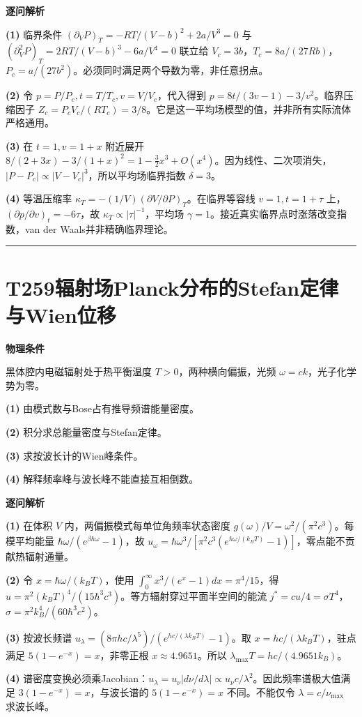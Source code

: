\documentclass[UTF8,a4paper,11pt,oneside,openany]{ctexbook}
\begin{document}
\par\medskip\noindent\textbf{逐问解析}
\par\noindent\textbf{(1)} 临界条件 \((\partial_VP)_T=-RT/(V-b)^2+2a/V^3=0\) 与 \((\partial_V^2P)_T=2RT/(V-b)^3-6a/V^4=0\) 联立给 \(V_c=3b\)，\(T_c=8a/(27Rb)\)，\(P_c=a/(27b^2)\)。必须同时满足两个导数为零，非任意拐点。
\par\noindent\textbf{(2)} 令 \(p=P/P_c,t=T/T_c,v=V/V_c\)，代入得到 \(p=8t/(3v-1)-3/v^2\)。临界压缩因子 \(Z_c=P_cV_c/(RT_c)=3/8\)。它是这一平均场模型的值，并非所有实际流体严格通用。
\par\noindent\textbf{(3)} 在 \(t=1,v=1+x\) 附近展开 \(8/(2+3x)-3/(1+x)^2=1-\tfrac32x^3+O(x^4)\)。因为线性、二次项消失，\(|P-P_c|\propto|V-V_c|^3\)，所以平均场临界指数 \(\delta=3\)。
\par\noindent\textbf{(4)} 等温压缩率 \(\kappa_T=-(1/V)(\partial V/\partial P)_T\)。在临界等容线 \(v=1,t=1+\tau\) 上，\((\partial p/\partial v)_t=-6\tau\)，故 \(\kappa_T\propto|\tau|^{-1}\)，平均场 \(\gamma=1\)。接近真实临界点时涨落改变指数，van der Waals并非精确临界理论。

\par\bigskip\hrule\bigskip
\section*{T259\quad 辐射场Planck分布的Stefan定律与Wien位移}
\textbf{物理条件}\par 黑体腔内电磁辐射处于热平衡温度 \(T>0\)，两种横向偏振，光频 \(\omega=ck\)，光子化学势为零。
\par\noindent\textbf{(1)} 由模式数与Bose占有推导频谱能量密度。
\par\noindent\textbf{(2)} 积分求总能量密度与Stefan定律。
\par\noindent\textbf{(3)} 求按波长计的Wien峰条件。
\par\noindent\textbf{(4)} 解释频率峰与波长峰不能直接互相倒数。

\par\medskip\noindent\textbf{逐问解析}
\par\noindent\textbf{(1)} 在体积 \(V\) 内，两偏振模式每单位角频率状态密度 \(g(\omega)/V=\omega^2/(\pi^2c^3)\)。每模平均能量 \(\hbar\omega/(e^{\beta\hbar\omega}-1)\)，故 \(u_\omega=\hbar\omega^3/[\pi^2c^3(e^{\hbar\omega/(k_BT)}-1)]\)，零点能不贡献热辐射通量。
\par\noindent\textbf{(2)} 令 \(x=\hbar\omega/(k_BT)\)，使用 \(\int_0^\infty x^3/(e^x-1)dx=\pi^4/15\)，得 \(u=\pi^2(k_BT)^4/(15\hbar^3c^3)\)。等方辐射穿过平面半空间的能流 \(j^*=cu/4=\sigma T^4\)，\(\sigma=\pi^2k_B^4/(60\hbar^3c^2)\)。
\par\noindent\textbf{(3)} 按波长频谱 \(u_\lambda=(8\pi hc/\lambda^5)/(e^{hc/(\lambda k_BT)}-1)\)。取 \(x=hc/(\lambda k_BT)\)，驻点满足 \(5(1-e^{-x})=x\)，非零正根 \(x\approx4.9651\)。所以 \(\lambda_{\max}T=hc/(4.9651k_B)\)。
\par\noindent\textbf{(4)} 谱密度变换必须乘Jacobian：\(u_\lambda=u_\nu|d\nu/d\lambda|\propto u_\nu c/\lambda^2\)。因此频率谱极大值满足 \(3(1-e^{-x})=x\)，与波长谱的 \(5(1-e^{-x})=x\) 不同。不能仅令 \(\lambda=c/\nu_{\max}\) 求波长峰。
\end{document}
